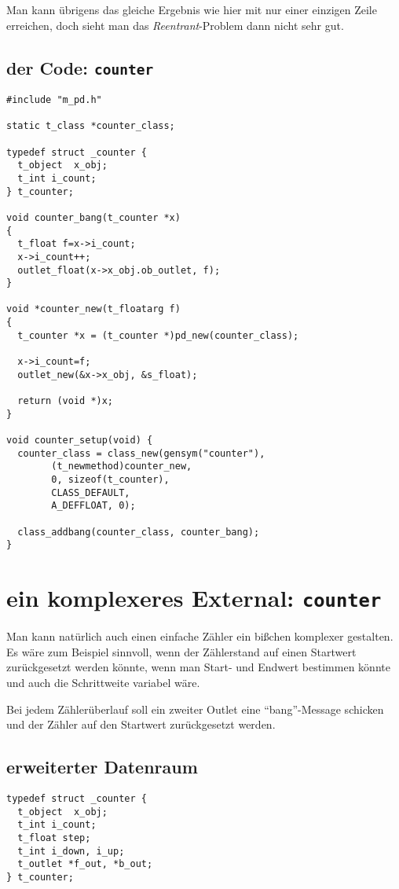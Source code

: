 \documentclass[12pt, a4paper,austrian, titlepage]{article}
\begin{document}
Man kann übrigens das gleiche Ergebnis wie hier mit nur einer einzigen Zeile erreichen, 
doch sieht man das {\em Reentrant}-Problem dann nicht sehr gut.

\subsection{der Code: \tt counter}

\begin{verbatim}
#include "m_pd.h"

static t_class *counter_class;

typedef struct _counter {
  t_object  x_obj;
  t_int i_count;
} t_counter;

void counter_bang(t_counter *x)
{
  t_float f=x->i_count;
  x->i_count++;
  outlet_float(x->x_obj.ob_outlet, f);
}

void *counter_new(t_floatarg f)
{
  t_counter *x = (t_counter *)pd_new(counter_class);

  x->i_count=f;
  outlet_new(&x->x_obj, &s_float);

  return (void *)x;
}

void counter_setup(void) {
  counter_class = class_new(gensym("counter"),
        (t_newmethod)counter_new,
        0, sizeof(t_counter),
        CLASS_DEFAULT,
        A_DEFFLOAT, 0);

  class_addbang(counter_class, counter_bang);
}
\end{verbatim}


\section{ein komplexeres External: \tt counter}

Man kann natürlich auch einen einfache Zähler ein bißchen komplexer gestalten.
Es wäre zum Beispiel sinnvoll,
wenn der Zählerstand auf einen Startwert zurückgesetzt werden könnte,
wenn man Start- und Endwert bestimmen könnte und auch die Schrittweite variabel wäre.

Bei jedem Zählerüberlauf soll ein zweiter Outlet eine ``bang''-Message schicken und der
Zähler auf den Startwert zurückgesetzt werden.

\subsection{erweiterter Datenraum}

\begin{verbatim}
typedef struct _counter {
  t_object  x_obj;
  t_int i_count;
  t_float step;
  t_int i_down, i_up;
  t_outlet *f_out, *b_out;
} t_counter;
\end{verbatim}
\end{document}

